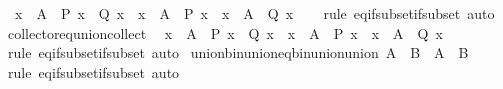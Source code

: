 \begin{isabellebody}
\ \ {\isachardoublequoteopen}{\isacharbraceleft}{\kern0pt}x\ {\isasymin}\ A\ {\isacharbar}{\kern0pt}\ P\ x\ {\isasymand}\ Q\ x{\isacharbraceright}{\kern0pt}\ {\isacharequal}{\kern0pt}\ {\isacharbraceleft}{\kern0pt}x\ {\isasymin}\ A\ {\isacharbar}{\kern0pt}\ P\ x{\isacharbraceright}{\kern0pt}\ {\isasyminter}\ {\isacharbraceleft}{\kern0pt}x\ {\isasymin}\ A\ {\isacharbar}{\kern0pt}\ Q\ x{\isacharbraceright}{\kern0pt}{\isachardoublequoteclose}\isanewline
%
\isadelimproof
\ \ %
\endisadelimproof
%
\isatagproof
{}\isamarkupfalse%
\ {\isacharparenleft}{\kern0pt}rule\ eq{\isacharunderscore}{\kern0pt}if{\isacharunderscore}{\kern0pt}subset{\isacharunderscore}{\kern0pt}if{\isacharunderscore}{\kern0pt}subset{\isacharparenright}{\kern0pt}\ auto%
\endisatagproof
{\isafoldproof}%
%
\isadelimproof
\isanewline
%
\endisadelimproof
\isanewline
{}\isamarkupfalse%
\ collect{\isacharunderscore}{\kern0pt}or{\isacharunderscore}{\kern0pt}eq{\isacharunderscore}{\kern0pt}union{\isacharunderscore}{\kern0pt}collect{\isacharcolon}{\kern0pt}\isanewline
\ \ {\isachardoublequoteopen}{\isacharbraceleft}{\kern0pt}x\ {\isasymin}\ A\ {\isacharbar}{\kern0pt}\ P\ x\ {\isasymor}\ Q\ x{\isacharbraceright}{\kern0pt}\ {\isacharequal}{\kern0pt}\ {\isacharbraceleft}{\kern0pt}x\ {\isasymin}\ A\ {\isacharbar}{\kern0pt}\ P\ x{\isacharbraceright}{\kern0pt}\ {\isasymunion}\ {\isacharbraceleft}{\kern0pt}x\ {\isasymin}\ A\ {\isacharbar}{\kern0pt}\ Q\ x{\isacharbraceright}{\kern0pt}{\isachardoublequoteclose}\isanewline
%
\isadelimproof
\ \ %
\endisadelimproof
%
\isatagproof
{}\isamarkupfalse%
\ {\isacharparenleft}{\kern0pt}rule\ eq{\isacharunderscore}{\kern0pt}if{\isacharunderscore}{\kern0pt}subset{\isacharunderscore}{\kern0pt}if{\isacharunderscore}{\kern0pt}subset{\isacharparenright}{\kern0pt}\ auto%
\endisatagproof
{\isafoldproof}%
%
\isadelimproof
\isanewline
%
\endisadelimproof
\isanewline
\isanewline
{}\isamarkupfalse%
\ union{\isacharunderscore}{\kern0pt}bin{\isacharunderscore}{\kern0pt}union{\isacharunderscore}{\kern0pt}eq{\isacharunderscore}{\kern0pt}bin{\isacharunderscore}{\kern0pt}union{\isacharunderscore}{\kern0pt}union{\isacharcolon}{\kern0pt}\ {\isachardoublequoteopen}{\isasymUnion}{\isacharparenleft}{\kern0pt}A\ {\isasymunion}\ B{\isacharparenright}{\kern0pt}\ {\isacharequal}{\kern0pt}\ {\isasymUnion}A\ {\isasymunion}\ {\isasymUnion}B{\isachardoublequoteclose}\isanewline
%
\isadelimproof
\ \ %
\endisadelimproof
%
\isatagproof
{}\isamarkupfalse%
\ {\isacharparenleft}{\kern0pt}rule\ eq{\isacharunderscore}{\kern0pt}if{\isacharunderscore}{\kern0pt}subset{\isacharunderscore}{\kern0pt}if{\isacharunderscore}{\kern0pt}subset{\isacharparenright}{\kern0pt}\ auto%

\end{isabellebody}
